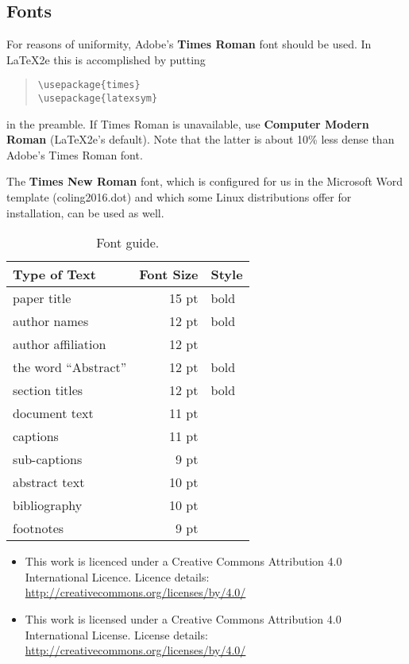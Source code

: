 \documentclass[11pt]{article}
\begin{document}
\subsection{Fonts}

For reasons of uniformity, Adobe's {\bf Times Roman} font should be
used. In \LaTeX2e{} this is accomplished by putting

\begin{quote}
\begin{verbatim}
\usepackage{times}
\usepackage{latexsym}
\end{verbatim}
\end{quote}
in the preamble. If Times Roman is unavailable, use {\bf Computer
  Modern Roman} (\LaTeX2e{}'s default).  Note that the latter is about
  10\% less dense than Adobe's Times Roman font.

The {\bf Times New Roman} font, which is configured for us in the
Microsoft Word template (coling2016.dot) and which some Linux
distributions offer for installation, can be used as well.

\begin{table}[h]
\begin{center}
\begin{tabular}{|l|rl|}
\hline \bf Type of Text & \bf Font Size & \bf Style \\ \hline
paper title & 15 pt & bold \\
author names & 12 pt & bold \\
author affiliation & 12 pt & \\
the word ``Abstract'' & 12 pt & bold \\
section titles & 12 pt & bold \\
document text & 11 pt  &\\
captions & 11 pt & \\
sub-captions & 9 pt & \\
abstract text & 10 pt & \\
bibliography & 10 pt & \\
footnotes & 9 pt & \\
\hline
\end{tabular}
\end{center}
\caption{\label{font-table} Font guide. }
\end{table}

\begin{itemize}
    \item  This work is licenced under a Creative Commons Attribution 4.0 International Licence. Licence details: \url{http://creativecommons.org/licenses/by/4.0/}
           
    \item This work is licensed under a Creative Commons Attribution 4.0 International License. License details: \url{http://creativecommons.org/licenses/by/4.0/}
           
           
           
\end{itemize}
\end{document}
